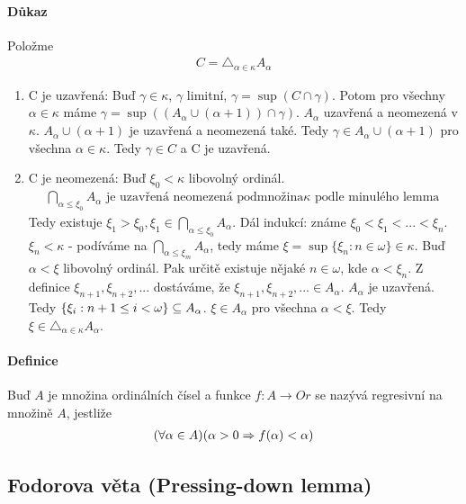 \documentclass[a4paper,12pt,titlepage]{article}
\begin{document}
\begin{enumerate}
\paragraph{Důkaz}
Položme
\begin{align}
	C = \triangle_{\alpha \in \kappa} A_\alpha
\end{align}
\begin{enumerate}
	\item C je uzavřená: Buď $\gamma \in \kappa$, $\gamma$ limitní, $\gamma = \sup(C \cap
	\gamma)$. Potom pro všechny $\alpha \in \kappa$ máme $\gamma = \sup((A_\alpha \cup
	(\alpha+1)) \cap \gamma)$. $A_\alpha$ uzavřená a neomezená v $\kappa$. $A_\alpha
	\cup (\alpha+1)$ je uzavřená a neomezená také. Tedy $\gamma \in A_\alpha \cup
	(\alpha+1)$ pro všechna $\alpha \in \kappa$. Tedy $\gamma \in C$ a C je uzavřená.
	\item C je neomezená: Buď $\xi_0 < \kappa$ libovolný ordinál.
	\begin{align}
		\bigcap_{\alpha \le \xi_0} A_\alpha \text{ je uzavřená neomezená
		podmnožina} \kappa \text{ podle minulého lemma }
	\end{align}
	Tedy existuje $\xi_1 > \xi_0, \xi_1 \in \bigcap_{\alpha\le\xi_0} A_\alpha$.
	Dál indukcí: známe $\xi_0 < \xi_1 < ... <\xi_n$. \\
	$\xi_n < \kappa$ - podíváme na $\bigcap_{\alpha \le \xi_m}
	A_\alpha$, tedy máme $\xi = \sup \{\xi_n : n \in \omega\} \in \kappa$.
	Buď $\alpha < \xi$ libovolný ordinál. Pak určitě existuje nějaké $n \in
	\omega$, kde $\alpha < \xi_n$. Z definice $\xi_{n+1}, \xi_{n+2}, ...$
	dostáváme, že $\xi_{n+1}, \xi_{n+2}, ...  \in A_\alpha$. $A_\alpha$ je uzavřená.
	Tedy $\{ \xi_i: n+1 \le i < \omega \} \subseteq A_\alpha$. $\xi \in A_\alpha$ pro
	všechna $\alpha < \xi$. Tedy $\xi \in \triangle_{\alpha\in\kappa} A_\alpha$.
\end{enumerate}


\paragraph{Definice}
Buď $A$ je množina ordinálních čísel a funkce $f: A \to Or$ se nazývá regresivní
na množině $A$, jestliže 
\begin{align}
	(\forall \alpha \in A) (\alpha > 0 \Rightarrow f(\alpha) < \alpha)
\end{align}

\subsection{Fodorova věta (Pressing-down lemma)}
\setcounter{equation}{0}

\end{enumerate}
\end{document}
